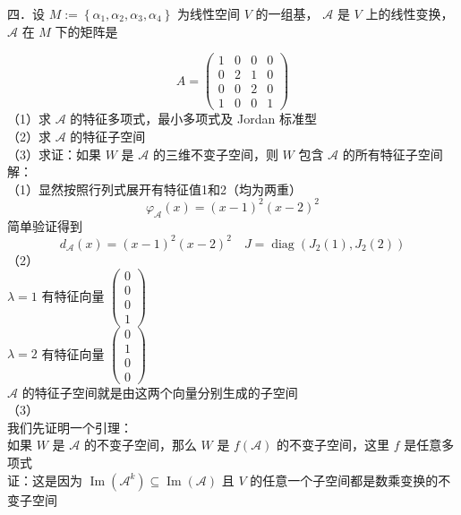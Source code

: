\documentclass[UTF8]{ctexart}
\begin{document}
\noindent 四．设 $M:=\left\{\alpha_{1}, \alpha_{2}, \alpha_{3}, \alpha_{4}\right\}$ 为线性空间 $V$ 的一组基， $\mathcal{A}$ 是 $V$ 上的线性变换， $\mathcal{A}$ 在 $M$ 下的矩阵是

$$
A=\left(\begin{array}{llll}
	1 & 0 & 0 & 0 \\
	0 & 2 & 1 & 0 \\
	0 & 0 & 2 & 0 \\
	1 & 0 & 0 & 1
\end{array}\right)
$$
（1）求 $\mathcal{A}$ 的特征多项式，最小多项式及 Jordan 标准型\\
（2）求 $\mathcal{A}$ 的特征子空间\\
（3）求证：如果 $W$ 是 $\mathcal{A}$ 的三维不变子空间，则 $W$ 包含 $\mathcal{A}$ 的所有特征子空间\\
解：\\
（1）显然按照行列式展开有特征值1和2（均为两重）\\
$$\varphi_{\mathcal{A}}(x)=(x-1)^{2}(x-2)^{2}$$
简单验证得到 $$d_{\mathcal{A}}(x)=(x-1)^{2}(x-2)^{2}\quad 
J=\operatorname{diag}\left(J_{2}(1), J_{2}(2)\right)$$
（2）\\
$\lambda=1$ 有特征向量 $\left(\begin{array}{l}0 \\ 0 \\ 0 \\ 1\end{array}\right)$\\
$\lambda=2$ 有特征向量 $\left(\begin{array}{l}0 \\ 1 \\ 0 \\ 0\end{array}\right)$\\
$\mathcal{A}$ 的特征子空间就是由这两个向量分别生成的子空间\\
（3）\\
我们先证明一个引理：\\
如果 $W$ 是 $\mathcal{A}$ 的不变子空间，那么 $W$ 是 $f(\mathcal{A})$ 的不变子空间，这里 $f$ 是任意多项式\\
证：这是因为 $\operatorname{Im}\left(\mathcal{A}^{k}\right) \subseteq \operatorname{Im}(\mathcal{A})$ 且 $V$ 的任意一个子空间都是数乘变换的不变子空间\\
\end{document}
